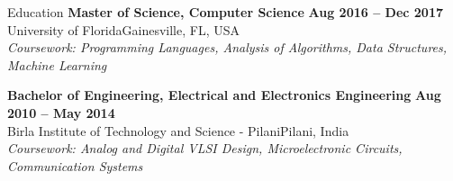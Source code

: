 \begin{rSection}{Education}
{\bfseries Master of Science, Computer Science} \hfill {\bfseries Aug 2016 -- Dec 2017} 
\\  University of Florida\hfill Gainesville, FL, USA
\\ {\itshape {Coursework}: Programming Languages, Analysis of Algorithms, Data Structures, Machine Learning}

{\bfseries Bachelor of Engineering, Electrical and Electronics Engineering} \hfill {\bfseries Aug 2010 -- May 2014}
\\ Birla Institute of Technology and Science - Pilani\hfill Pilani, India
\\ {\itshape {Coursework}: Analog and Digital VLSI Design, Microelectronic Circuits, Communication Systems}

\end{rSection}